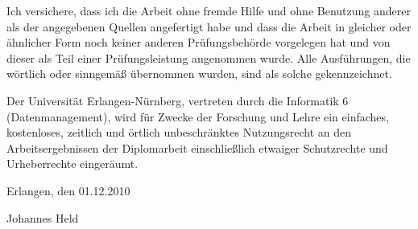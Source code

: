 \thispagestyle{empty}
Ich versichere, dass ich die Arbeit ohne fremde Hilfe und ohne Benutzung anderer als der angegebenen Quellen angefertigt habe und dass die Arbeit in gleicher oder ähnlicher Form noch keiner anderen Prüfungsbehörde vorgelegen hat und von dieser als Teil einer Prüfungsleistung angenommen wurde. Alle Ausführungen, die wörtlich oder sinngemäß übernommen wurden, sind als solche gekennzeichnet.
\vspace{2cm}

Der Universität Erlangen-Nürnberg, vertreten durch die Informatik 6 (Datenmanagement), wird für Zwecke der Forschung und Lehre ein einfaches, kostenloses, zeitlich und örtlich unbeschränktes Nutzungsrecht an den Arbeitsergebnissen der Diplomarbeit einschließlich etwaiger Schutzrechte und Urheberrechte eingeräumt.

\vspace{2cm}
Erlangen, den 01.12.2010

\vspace{2cm}
Johannes Held \hfill \ 

\vspace{0,5cm}

\clearpage{\pagestyle{empty}\cleardoublepage}
